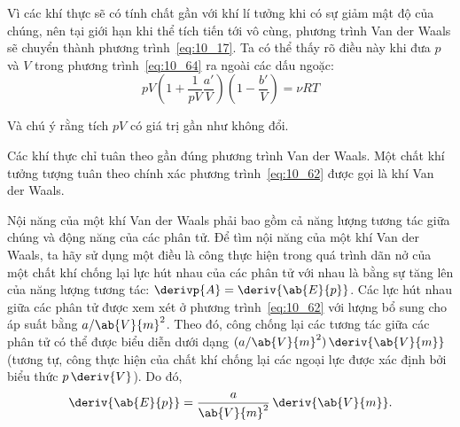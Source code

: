 Vì các khí thực sẽ có tính chất gần với khí lí tưởng khi có sự giảm mật độ của chúng, nên tại giới hạn khi thể tích tiến tới vô cùng, phương trình Van der Waals sẽ chuyển thành phương trình~\eqref{eq:10_17}. Ta có thể thấy rõ điều này khi đưa $p$ và $V$ trong phương trình~\eqref{eq:10_64} ra ngoài các dấu ngoặc:
\begin{equation*}
	pV\left(1 + \frac{1}{pV}\frac{a'}{V}\right)\left(1 - \frac{b'}{V}\right) = \nu RT
\end{equation*}

\noindent

Và chú ý rằng tích $pV$ có giá trị gần như không đổi.


Các khí thực chỉ tuân theo gần đúng phương trình Van der Waals. Một chất khí tưởng tượng tuân theo chính xác phương trình~\eqref{eq:10_62} được gọi là khí Van der Waals. 


Nội năng của một khí Van der Waals phải bao gồm cả năng lượng tương tác giữa chúng và động năng của các phân tử. Để tìm nội năng của một khí Van der Waals, ta hãy sử dụng một điều là công thực hiện trong quá trình dãn nở của một chất khí chống lại lực hút nhau của các phân tử với nhau là bằng sự tăng lên của năng lượng tương tác: $\derivp{A}= \deriv{\ab{E}{p}}$. Các lực hút nhau giữa các phân tử được xem xét ở phương trình~\eqref{eq:10_62} với lượng bổ sung cho áp suất bằng $a/\ab{V}{m}^2$. Theo đó, công chống lại các tương tác giữa các phân tử có thể được biểu diễn dưới dạng $(a/\ab{V}{m}^2)\,\deriv{\ab{V}{m}}$ (tương tự, công thực hiện của chất khí chống lại các ngoại lực được xác định bởi biểu thức $p\,\deriv{V}$). Do đó,           
\begin{equation*}
	\deriv{\ab{E}{p}} = \frac{a}{\ab{V}{m}^2}\,\deriv{\ab{V}{m}}.
\end{equation*}


